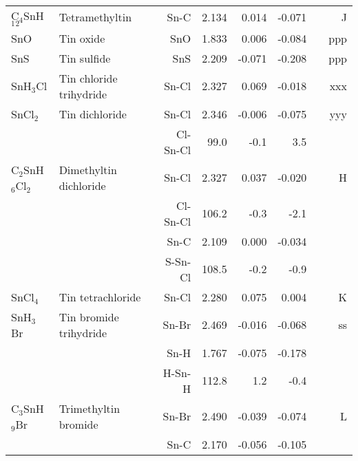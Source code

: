 \begin{table}
\begin{center}
\begin{tabular}{llrrrrrr}
 C$_4$SnH$_1$$_2$     & Tetramethyltin                     &Sn-C           &     2.134   &     0.014 &    -0.071 &  &     J \\
 SnO         & Tin oxide                          &SnO            &     1.833   &     0.006 &    -0.084 &  &   ppp \\
 SnS         & Tin sulfide                        &SnS            &     2.209   &    -0.071 &    -0.208 &  &   ppp \\
 SnH$_3$Cl      & Tin chloride trihydride            &Sn-Cl          &     2.327   &     0.069 &    -0.018 &  &   xxx \\
 SnCl$_2$       & Tin dichloride                     &Sn-Cl          &     2.346   &    -0.006 &    -0.075 &  &   yyy \\
             &                                    &Cl-Sn-Cl     &      99.0   &      -0.1 &       3.5 &    &       \\
 C$_2$SnH$_6$Cl$_2$   & Dimethyltin dichloride             &Sn-Cl          &     2.327   &     0.037 &    -0.020 &  &     H \\
             &                                    &Cl-Sn-Cl     &     106.2   &      -0.3 &      -2.1 &    &       \\
             &                                    &Sn-C           &     2.109   &     0.000 &    -0.034 &  &       \\
             &                                    &S-Sn-Cl      &     108.5   &      -0.2 &      -0.9 &    &       \\
 SnCl$_4$       & Tin tetrachloride                  &Sn-Cl          &     2.280   &     0.075 &     0.004 &  &     K \\
 SnH$_3$Br      & Tin bromide trihydride             &Sn-Br          &     2.469   &    -0.016 &    -0.068 &  &    ss \\
             &                                    &Sn-H           &     1.767   &    -0.075 &    -0.178 &  &       \\
             &                                    &H-Sn-H       &     112.8   &       1.2 &      -0.4 &    &       \\
 C$_3$SnH$_9$Br    & Trimethyltin bromide               &Sn-Br          &     2.490   &    -0.039 &    -0.074 &  &     L \\
             &                                    &Sn-C           &     2.170   &    -0.056 &    -0.105 &  &       \\
\hline
\end{tabular}
\end{center}
\end{table}
\clearpage

